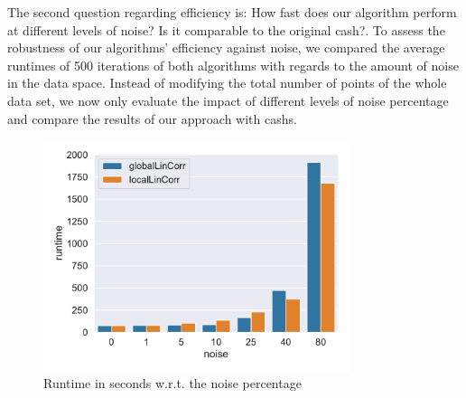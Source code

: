 The second question regarding efficiency is: How fast does our algorithm perform at different levels of noise? Is it comparable to the original \gls{cash}?. To assess the robustness of our algorithms' efficiency against noise, we compared the average runtimes of 500 iterations of both algorithms with regards to the amount of noise in the data space. Instead of modifying the total number of points of the whole data set, we now only evaluate the impact of different levels of noise percentage and compare the results of our approach with \gls{cash}s.


\begin{figure}[h]
    \centering
        \includegraphics[width=0.8\textwidth]{evaluation/per_noise/Avg_Runtime_3D_O10000_pnoise_bar.pdf}
    \caption{Runtime in seconds w.r.t. the noise percentage}
    \label{fig:eval_per_noise}
\end{figure}

